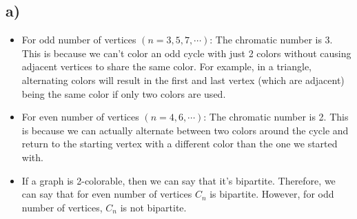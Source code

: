 \documentclass[12pt]{article}
\begin{document}
\subsection*{a)}
\begin{itemize}
	\item For odd number of vertices $(n=3,5,7, \cdots)$: The chromatic number is 3. This is because we can't color an odd cycle with just 2 colors without causing adjacent vertices to share the same color. For example, in a triangle, alternating colors will result in the first and last vertex (which are adjacent) being the same color if only two colors are used.
    \item For even number of vertices $(n=4,6, \cdots)$: The chromatic number is 2. This is because we can actually alternate between two colors around the cycle and return to the starting vertex with a different color than the one we started with.
    \item If a graph is 2-colorable, then we can say that it's bipartite. Therefore, we can say that for even number of vertices $C_n$ is bipartite. However, for odd number of vertices, $C_n$ is not bipartite.
\end{itemize}
\end{document}

